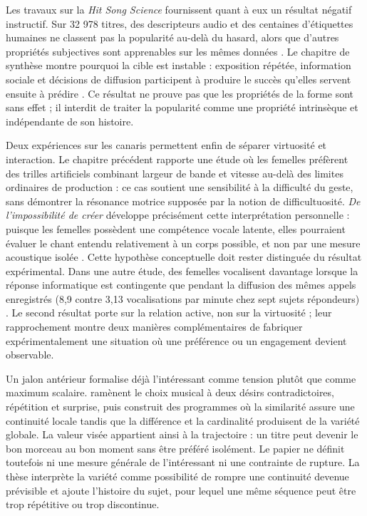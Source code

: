 \documentclass[11pt,a4paper]{article}
\begin{document}
Les travaux sur la \emph{Hit Song Science} fournissent quant à eux un résultat
négatif instructif. Sur 32 978 titres, des descripteurs audio et des centaines
d'étiquettes humaines ne classent pas la popularité au-delà du hasard, alors que
d'autres propriétés subjectives sont apprenables sur les mêmes données
\parencite{pachetroy2008hitsong}. Le chapitre de synthèse montre pourquoi la cible
est instable : exposition répétée, information sociale et décisions de diffusion
participent à produire le succès qu'elles servent ensuite à prédire
\parencite{pachet2011hitsong}. Ce résultat ne prouve pas que les propriétés de la
forme sont sans effet ; il interdit de traiter la popularité comme une propriété
intrinsèque et indépendante de son histoire.

Deux expériences sur les canaris permettent enfin de séparer virtuosité et
interaction. Le chapitre précédent rapporte une étude où les femelles préfèrent
des trilles artificiels combinant largeur de bande et vitesse au-delà des limites
ordinaires de production : ce cas soutient une sensibilité à la difficulté du
geste, sans démontrer la résonance motrice supposée par la notion de
difficultuosité. \emph{De l'impossibilité de créer} développe précisément cette
interprétation personnelle : puisque les femelles possèdent une compétence vocale
latente, elles pourraient évaluer le chant entendu relativement à un corps possible,
et non par une mesure acoustique isolée \parencite{pachet2026impossibilite}. Cette
hypothèse conceptuelle doit rester distinguée du résultat expérimental. Dans une
autre étude, des femelles vocalisent davantage lorsque
la réponse informatique est contingente que pendant la diffusion des mêmes
appels enregistrés (8,9 contre 3,13 vocalisations par minute chez sept sujets
répondeurs) \parencite{pachet2011hitsong,lerch2011closedloop}. Le second résultat
porte sur la relation active, non sur la virtuosité ; leur rapprochement montre
deux manières complémentaires de fabriquer expérimentalement une situation où
une préférence ou un engagement devient observable.

Un jalon antérieur formalise déjà l'intéressant comme tension plutôt que comme
maximum scalaire. \textcite{pachet1999programs} ramènent le choix musical à deux
désirs contradictoires, répétition et surprise, puis construit des programmes où
la similarité assure une continuité locale tandis que la différence et la
cardinalité produisent de la variété globale. La valeur visée appartient ainsi à
la trajectoire : un titre peut devenir le bon morceau au bon moment sans être
préféré isolément. Le papier ne définit toutefois ni une mesure générale de
l'intéressant ni une contrainte de rupture. La thèse interprète la variété comme
possibilité de rompre une continuité devenue prévisible et ajoute l'histoire du
sujet, pour lequel une même séquence peut être trop répétitive ou trop
discontinue.
\end{document}

